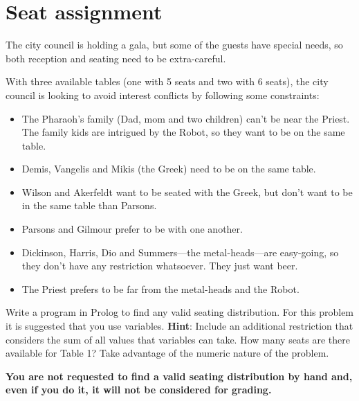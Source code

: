 \documentclass{article}
\begin{document}
\section{Seat assignment}

The city council is holding a gala, but some of the guests have special needs, so both reception and seating need to be extra-careful.

With three available tables (one with 5 seats and two with 6 seats), the city council is looking to avoid interest conflicts by following some constraints:

\begin{itemize}
    \item The Pharaoh's family (Dad, mom and two children) can't be near the Priest. The family kids are intrigued by the Robot, so they want to be on the same table.
    \item Demis, Vangelis and Mikis (the Greek) need to be on the same table.
    \item Wilson and Akerfeldt want to be seated with the Greek, but don't want to be in the same table than Parsons.
    \item Parsons and Gilmour prefer to be with one another.
    \item Dickinson, Harris, Dio and Summers---the metal-heads---are easy-going, so they don't have any restriction whatsoever. They just want beer.
    \item The Priest prefers to be far from the metal-heads and the Robot.
\end{itemize}

Write a program in Prolog to find any valid seating distribution. For this problem it is suggested that you use variables.
\textbf{Hint}: Include an additional restriction that considers the sum of all values that variables can take. How many seats are there available for Table 1? Take advantage of the numeric nature of the problem.

\textbf{You are not requested to find a valid seating distribution by hand and, even if you do it, it will not be considered for grading.} 
\end{document}

